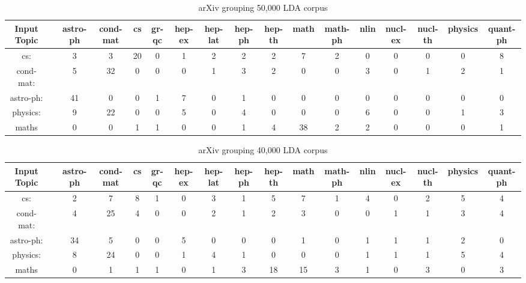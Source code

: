 \chapter{}
\pagestyle{empty}
\begin{sidewaystable}[h]
    \begin{tabular}{|c c c c c c c c c c c c c c c c c|}
         \hline
         Input Topic & & astro-ph & cond-mat & cs & gr-qc & hep-ex &hep-lat & hep-ph & hep-th & math & math-ph & nlin & nucl-ex & nucl-th & physics & quant-ph \\ [0.5ex]
         \hline\hline
         cs: & & 3 & 3 & 20 & 0 & 1 & 2 & 2 & 2 & 7 & 2 & 0 & 0 & 0 & 0 & 8  \\
         cond-mat: & & 5 & 32 & 0 & 0 & 0 & 1 & 3 & 2 & 0 & 0 & 3 & 0 & 1 & 2 & 1 \\
         astro-ph: & & 41 & 0 & 0 & 1 & 7 & 0 & 1 & 0 & 0 & 0 & 0 & 0 & 0 & 0 & 0 \\
         physics: & & 9 & 22 & 0 & 0 & 5 & 0 & 4 & 0 & 0 & 0 & 6 & 0 & 0 & 1 & 3 \\
         maths & & 0 & 0 & 1 & 1 & 0 & 0 & 1 & 4 & 38 & 2 & 2 & 0 & 0 & 0 & 1\\ [1ex]
         \hline
    \end{tabular}
    \caption{arXiv grouping 50,000 LDA corpus}
    \label{table:arxiv50000lda}
\end{sidewaystable}

\begin{sidewaystable}[h]
    \begin{tabular}{|c c c c c c c c c c c c c c c c c|}
         \hline
         Input Topic & & astro-ph & cond-mat & cs & gr-qc & hep-ex &hep-lat & hep-ph & hep-th & math & math-ph & nlin & nucl-ex & nucl-th & physics & quant-ph \\ [0.5ex]
         \hline\hline
         cs: & & 2 & 7 & 8 & 1 & 0 & 3 & 1 & 5 & 7 & 1 & 4 & 0 & 2 & 5 & 4 \\
         cond-mat: & & 4 & 25 & 4 & 0 & 0 & 2 & 1 & 2 & 3 & 0 & 0 & 1 & 1 & 3 & 4 \\
         astro-ph: & & 34 & 5 & 0 & 0 & 5 & 0 & 0 & 0 & 1 & 0 & 1 & 1 & 1 & 2 & 0 \\
         physics: & & 8 & 24 & 0 & 0 & 1 & 4 & 1 & 0 & 0 & 0 & 1 & 1 & 1 & 5 & 4 \\
         maths & & 0 & 1 & 1 & 1 & 0 & 1 & 3 & 18 & 15 & 3 & 1 & 0 & 3 & 0 & 3\\ [1ex]
         \hline
    \end{tabular}
    \caption{arXiv grouping 40,000 LDA corpus}
    \label{table:arxiv40000lda}
\end{sidewaystable}

